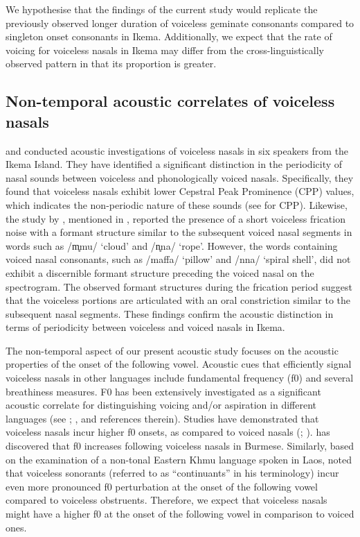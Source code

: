 \documentclass[output=paper]{langscibook}
\begin{document}
We hypothesise that the findings of the current study would replicate the previously observed longer duration of voiceless geminate consonants compared to singleton onset consonants in Ikema. Additionally, we expect that the rate of voicing for voiceless nasals in Ikema may differ from the cross-linguistically observed pattern in that its proportion is greater.

\subsection{Non-temporal acoustic correlates of voiceless nasals}\label{sec:shinohara:2.3}
\citet{Ford2016} and \citet{FordEtAl2022} conducted acoustic investigations of voiceless nasals in six speakers from the Ikema Island. They have identified a significant distinction in the periodicity of nasal sounds between voiceless and phonologically voiced nasals. Specifically, they found that voiceless nasals exhibit lower Cepstral Peak Prominence (CPP) values, which indicates the non-periodic nature of these sounds (see \citealt{HillenbrandEtAl1994} for CPP). Likewise, the study by \citet{ShinoharaFujimoto2018}, mentioned in , reported the presence of a short voiceless frication noise with a formant structure similar to the subsequent voiced nasal segments in words such as /m̥mu/ ‘cloud’ and /n̥na/ ‘rope’. However, the words containing voiced nasal consonants, such as /maffa/ ‘pillow’ and /nna/ ‘spiral shell’, did not exhibit a discernible formant structure preceding the voiced nasal on the spectrogram. The observed formant structures during the frication period suggest that the voiceless portions are articulated with an oral constriction similar to the subsequent nasal segments. These findings confirm the acoustic distinction in terms of periodicity between voiceless and voiced nasals in Ikema.

The non-temporal aspect of our present acoustic study focuses on the acoustic properties of the onset of the following vowel. Acoustic cues that efficiently signal voiceless nasals in other languages include fundamental frequency (f0) and several breathiness measures. F0 has been extensively investigated as a significant acoustic correlate for distinguishing voicing and/or aspiration in different languages (see \citealt{Hombert1978}; \citealt{Hussain2021}, and references therein). Studies have demonstrated that voiceless nasals incur higher f0 onsets, as compared to voiced nasals (\citealt{Maddieson1984}; \citealt{Kirby2021}). \citet{Maddieson1984} has discovered that f0 increases following voiceless nasals in Burmese. Similarly, based on the examination of a non-tonal Eastern Khmu language spoken in Laos, \citet{Kirby2021} noted that voiceless sonorants (referred to as “continuants” in his terminology) incur even more pronounced f0 perturbation at the onset of the following vowel compared to voiceless obstruents. Therefore, we expect that voiceless nasals might have a higher f0 at the onset of the following vowel in comparison to voiced ones.
\end{document}
